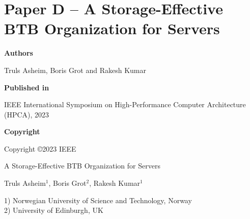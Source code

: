 \documentclass[../../../main.tex]{subfiles}
\begin{document}
\chapter{Paper D -- A Storage-Effective BTB Organization for Servers}
\label{chap:hpca-paper}

\noindent \textbf{Authors}

\vspace*{0.3cm}

\noindent Truls Asheim, Boris Grot and Rakesh Kumar

\vspace*{0.7cm}

\noindent \textbf{Published in}

\vspace*{0.3cm}

\noindent IEEE International Symposium on High-Performance Computer Architecture (HPCA), 2023

\vspace*{0.7cm}

\noindent \textbf{Copyright}

\vspace*{0.3cm}

\noindent Copyright ©2023 IEEE 

\newpage

\vspace*{0.1cm}

\begin{center}

\Huge{A Storage-Effective BTB Organization for Servers}

\vspace{0.6cm}

\large{Truls Asheim$^{1}$, Boris Grot$^{2}$, Rakesh Kumar$^{1}$}

\vspace{0.1cm}

\small{1) Norwegian University of Science and Technology, Norway}\\
\small{2) University of Edinburgh, UK}


\end{center}

\vspace{0.2cm}
\end{document}
